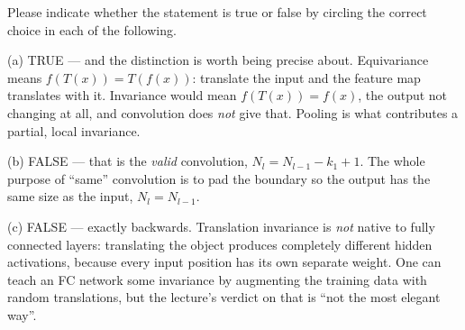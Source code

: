 \documentclass[11pt]{exam}
\newcommand{\TFT}{\ifprintanswers\textbf{TRUE}\hspace{1.1em}False\else True\hspace{1.1em}False\fi}
\newcommand{\TFF}{True\hspace{1.1em}\ifprintanswers\textbf{FALSE}\else False\fi}
\begin{document}
\begin{questions}
\question
Please indicate whether the statement is true or false by circling the correct choice in each of
the following.


\begin{solution}
  (a) TRUE --- and the distinction is worth being precise about. Equivariance means
  $f(T(x)) = T(f(x))$: translate the input and the feature map translates with it. Invariance would
  mean $f(T(x)) = f(x)$, the output not changing at all, and convolution does \emph{not} give that.
  Pooling is what contributes a partial, local invariance.

  (b) FALSE --- that is the \emph{valid} convolution, $N_l = N_{l-1} - k_1 + 1$. The whole purpose
  of ``same'' convolution is to pad the boundary so the output has the same size as the input,
  $N_l = N_{l-1}$.

  (c) FALSE --- exactly backwards. Translation invariance is \emph{not} native to fully connected
  layers: translating the object produces completely different hidden activations, because every
  input position has its own separate weight. One can teach an FC network some invariance by
  augmenting the training data with random translations, but the lecture's verdict on that is
  ``not the most elegant way''.


\end{solution}
\end{questions}
\end{document}
